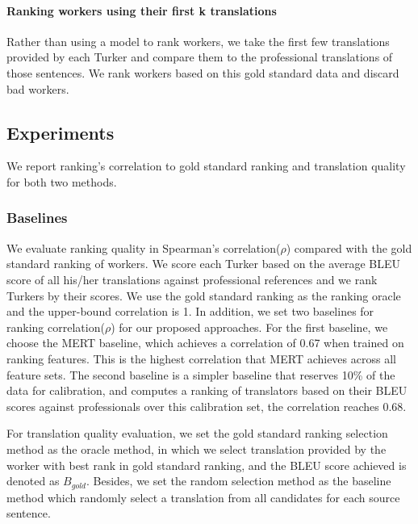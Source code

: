 \documentclass[11pt,letterpaper]{article}
\begin{document}
\paragraph{Ranking workers using their first k translations}
Rather than using a model to rank workers, we take the first few translations provided by each Turker  and compare them to the professional translations of those sentences. We rank workers based on this gold standard data and discard bad workers.





\subsection{Experiments}
We report ranking's correlation to gold standard ranking and translation quality for both two methods.

\subsubsection{Baselines}
We evaluate ranking quality in Spearman's correlation($\rho$) compared with the gold standard ranking of workers. We score each Turker based on the average BLEU score of all his/her translations against professional references and we rank Turkers by their scores. We use the gold standard ranking as the ranking oracle and the upper-bound correlation is 1. In addition, we set two baselines for ranking correlation($\rho$) for our proposed approaches. For the first baseline,  we choose the MERT\cite{och2003minimum} baseline, which achieves a correlation of  0.67 when trained on ranking features. This is the highest correlation that  MERT achieves across all feature sets. The second baseline is a simpler baseline that reserves 10\% of the data for calibration, and computes a ranking of translators based on their BLEU scores against professionals over this calibration set, the correlation reaches 0.68.  

For translation quality evaluation, we set the gold standard ranking selection method as the oracle method, in which we select translation provided by the worker with best rank in gold standard ranking, and the BLEU score achieved is denoted as $B_{gold}$.
Besides, we set the random selection method as the baseline method which randomly select a translation from all candidates for each source sentence. 
\end{document}

